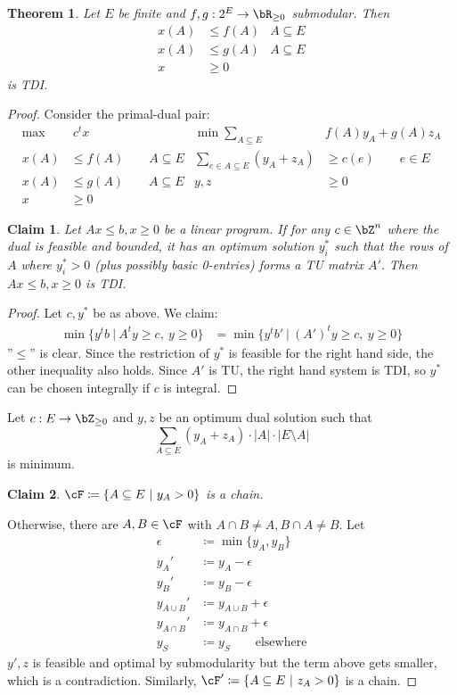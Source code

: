 \documentclass[11pt, a4paper]{article}
\newcommand{\abs}[1]{\left\lvert#1\right\rvert}
\newcommand{\set}[1]{\{#1\}}
\newtheorem{theorem}{Theorem}[section]
\newtheorem*{claim}{Claim}
\theoremstyle{remark}
\theoremstyle{definition}
\begin{document}
\begin{theorem}\label{thm:submodular-ineq-tdi}
	Let $E$ be finite and $f,g: 2^E\to\bR_{\geq0}$ submodular. Then
	\begin{align*}
		x(A) & \leq f(A) & A\subseteq E \\
		x(A) & \leq g(A) & A\subseteq E \\
		x    & \geq0
	\end{align*}
	is TDI.
\end{theorem}
\begin{proof}
	Consider the primal-dual pair:
	\begin{align*}
		\max & \ c^tx                        & \min\sum_{A\subseteq E}           & f(A)y_A + g(A)z_A       \\
		x(A) & \leq f(A) \qquad A\subseteq E & \sum_{e\in A\subseteq E}(y_A+z_A) & \geq c(e) \qquad e\in E \\
		x(A) & \leq g(A) \qquad A\subseteq E & y,z                               & \geq0                   \\
		x    & \geq 0
	\end{align*}
	\begin{claim}
		Let $Ax\leq b, x\geq0$ be a linear program. If for any $c\in\bZ^n$ where
		the dual is feasible and bounded, it has an optimum solution $y_i^*$ such that the rows
		of $A$ where $y_i^*>0$ (plus possibly basic 0-entries)
		forms a TU matrix $A'$. Then $Ax\leq b, x\geq0$ is TDI.
	\end{claim}
	\begin{proof}
		Let $c,y^*$ be as above. We claim:
		\begin{align*}
			\min\set{y^tb\ |\ A^ty\geq c,\ y\geq0} & =\min\set{y^tb'\ |\ (A')^ty\geq c,\ y\geq0}
		\end{align*}
		''$\leq$'' is clear. Since the restriction of $y^*$ is feasible for the
		right hand side, the other inequality also holds. Since $A'$ is TU,
		the right hand system is TDI, so $y^*$ can be chosen integrally if $c$
		is integral.
	\end{proof}
	Let $c: E\to\bZ_{\geq0}$ and $y,z$ be an optimum dual solution such that
	\[\sum_{A\subseteq E}(y_A+z_A)\cdot\abs{A}\cdot\abs{E\setminus A}\]
	is minimum.
	\begin{claim}
		$\cF\coloneqq \set{A\subseteq E\ |\ y_A>0}$ is a chain.
	\end{claim}
	Otherwise, there are $A,B\in\cF$ with $A\cap B\neq A, B\cap A\neq B$. Let
	\begin{align*}
		\epsilon     & \coloneqq \min\set{y_A,y_B}          \\
		y_A'         & \coloneqq y_A-\epsilon               \\
		y_B'         & \coloneqq y_B-\epsilon               \\
		y_{A\cup B}' & \coloneqq y_{A\cup B}+\epsilon       \\
		y_{A\cap B}' & \coloneqq y_{A\cap B}+\epsilon       \\
		y_S          & \coloneqq y_S \qquad\text{elsewhere}
	\end{align*}
	$y',z$ is feasible and optimal by submodularity but the term above gets
	smaller, which is a contradiction. Similarly, $\cF'\coloneqq \set{A\subseteq
			E\ |\ z_A>0}$ is a chain.


\end{proof}
\end{document}

